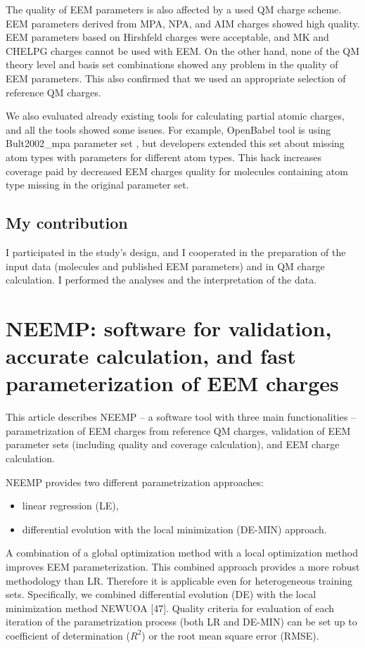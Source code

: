 The quality of EEM parameters is also affected by a used QM charge scheme.
EEM parameters derived from MPA, NPA, and AIM charges showed high quality.
EEM parameters based on Hirshfeld charges were acceptable, and MK and CHELPG
charges cannot be used with EEM.  On the other hand, none of the QM theory level
and basis set combinations showed any problem in the quality of EEM parameters.
This also confirmed that we used an appropriate selection of reference QM
charges.

We also evaluated already existing tools for calculating partial atomic charges,
and all the tools showed some issues. For example, OpenBabel tool is using
Bult2002\_mpa parameter set \cite{Bultinck2002}, but developers extended this
set about missing atom types with parameters for different atom types. This hack
increases coverage paid by decreased EEM charges quality for molecules
containing atom type missing in the original parameter set.  

\subsection{My contribution}

I participated in the study's design, and I cooperated in the preparation of
the input data (molecules and published EEM parameters) and in QM charge 
calculation. I performed the analyses and the interpretation of the data.

\section{NEEMP: software for validation, accurate calculation, and fast
parameterization of EEM charges} \label{sec:neemp-article}

This article describes NEEMP -- a software tool with three main
functionalities -- parametrization of EEM charges from reference QM charges,
validation of EEM parameter sets (including quality and coverage calculation),
and EEM charge calculation.

NEEMP provides two different parametrization approaches:

\begin{itemize}
    \item linear regression (LE),
    \item differential evolution with the local minimization (DE-MIN) approach. 
\end{itemize}

A combination of a global optimization method with a local optimization method
improves EEM parameterization. This combined approach provides a more robust
methodology than LR. Therefore it is applicable even for heterogeneous training
sets. Specifically, we combined differential evolution (DE) with the local
minimization method NEWUOA [47]. Quality criteria for evaluation of each 
iteration of the parametrization process (both LR and DE-MIN) can be set up to
coefficient of determination ($R^2$) or the root mean square error (RMSE).

